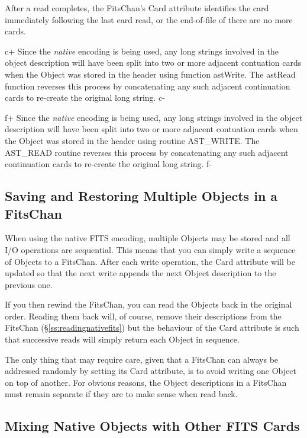 \documentclass[twoside,11pt]{article}
\newcommand{\secref}[1]{\S\ref{#1}}
\newcommand{\secref}[1]{\ref{#1}}
\begin{document}
After a read completes, the FitsChan's Card attribute identifies the
card immediately following the last card read, or the end-of-file of
there are no more cards.

c+
Since the {\em native} encoding is being used, any long strings involved
in the object description will have been split into two or more adjacent
contuation cards when the Object was stored in the header using function
astWrite. The astRead function reverses this process by concatenating any
such adjacent continuation cards to re-create the original long string.
c-

f+
Since the {\em native} encoding is being used, any long strings involved
in the object description will have been split into two or more adjacent
contuation cards when the Object was stored in the header using routine
AST\_WRITE. The AST\_READ routine reverses this process by concatenating
any such adjacent continuation cards to re-create the original long
string.
f-

\subsection{Saving and Restoring Multiple Objects in a FitsChan}

When using the native FITS encoding, multiple Objects may be stored
and all I/O operations are sequential.  This means that you can simply
write a sequence of Objects to a FitsChan. After each write operation,
the Card attribute will be updated so that the next write appends the
next Object description to the previous one.

If you then rewind the FitsChan, you can read the Objects back in the
original order. Reading them back will, of course, remove their
descriptions from the FitsChan (\secref{ss:readingnativefits}) but the
behaviour of the Card attribute is such that successive reads will
simply return each Object in sequence.

The only thing that may require care, given that a FitsChan can always
be addressed randomly by setting its Card attribute, is to avoid
writing one Object on top of another. For obvious reasons, the Object
descriptions in a FitsChan must remain separate if they are to make
sense when read back.

\subsection{Mixing Native Objects with Other FITS Cards}
\end{document}
